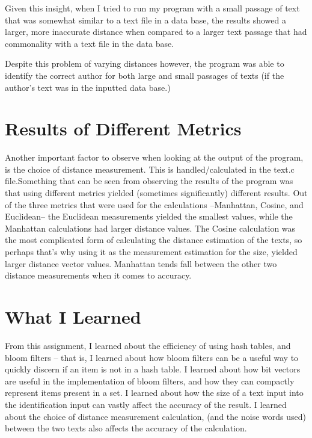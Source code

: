 \documentclass[11pt]{article}
\begin{document}
Given this insight, when I tried to run my program with a small passage of text that was somewhat similar to a text file in a data base, the results showed a larger, more inaccurate distance when compared to a larger text passage that had commonality with a text file in the data base.

Despite this problem of varying distances however, the program was able to identify the correct author for both large and small passages of texts (if the author's text was in the inputted data base.)

\section{Results of Different Metrics}
Another important factor to observe when looking at the output of the program, is the choice of distance measurement. This is handled/calculated in the text.c file.Something that can be seen from observing the results of the program was that using different metrics yielded (sometimes significantly) different results. Out of the three metrics that were used for the calculations --Manhattan, Cosine, and Euclidean-- the Euclidean measurements yielded the smallest values, while the Manhattan calculations had larger distance values. The Cosine calculation was the most complicated form of calculating the distance estimation of the texts, so perhaps that's why using it as the measurement estimation for the size, yielded larger distance vector values. Manhattan tends fall between the other two distance measurements when it comes to accuracy.

\section{What I Learned}
From this assignment, I learned about the efficiency of using hash tables, and bloom filters -- that is, I learned about how bloom filters can be a useful way to quickly discern if an item is not in a hash table. I learned about how bit vectors are useful in the implementation of bloom filters, and how they can compactly represent items present in a set. I learned about how the size of a text input into the identification input can vastly affect the accuracy of the result. I learned about the choice of distance measurement calculation, (and the noise words used) between the two texts also affects the accuracy of the calculation. 
\end{document}
